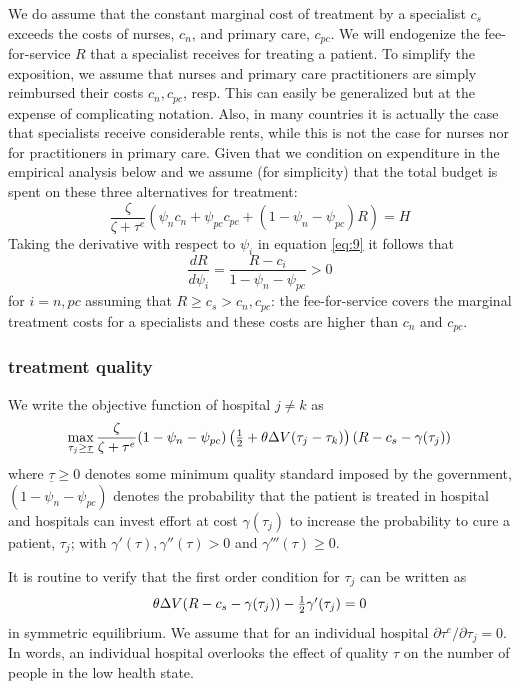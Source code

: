 \documentclass[12pt,english,a4paper]{article}
\begin{document}
We do assume that the constant marginal cost of treatment by a specialist \(c_s\) exceeds the costs of nurses, \(c_n\), and primary care, \(c_{pc}\). We will endogenize the fee-for-service \(R\) that a specialist receives for treating a patient. To simplify the exposition, we assume that nurses and primary care practitioners are simply reimbursed their costs \(c_n, c_{pc}\), resp. This can easily be generalized but at the expense of complicating notation. Also, in many countries it is actually the case that specialists receive considerable rents, while this is not the case for nurses nor for practitioners in primary care. Given that we condition on expenditure in the empirical analysis below and we assume (for simplicity) that the total budget is spent on these three alternatives for treatment:
\begin{equation}
\label{eq:9}
\frac{\zeta}{\zeta + \tau^e}(\psi_n c_n + \psi_{pc} c_{pc} + (1-\psi_n-\psi_{pc}) R) = H
\end{equation}
Taking the derivative with respect to \(\psi_i\) in equation \eqref{eq:9} it follows that
\begin{equation}
\label{eq:11}
\frac{dR}{d\psi_i} = \frac{R-c_i}{1-\psi_n - \psi_{pc}} > 0
\end{equation}
for \(i=n,pc\) assuming that \(R \geq c_s>c_n,c_{pc}\): the fee-for-service covers the marginal treatment costs for a specialists and these costs are higher than \(c_n\) and \(c_{pc}\).

\subsubsection{treatment quality}
\label{sec:org930fd7d}

We write the objective function of hospital \(j \neq k\) as
\begin{equation}
\label{eq:12}
\max_{\tau_j \geq \underline \tau} \frac{\zeta}{\zeta + \tau^e}(1-\psi_n-\psi_{pc})\left( \textstyle{1\over 2}  + \theta \Delta V (\tau_j - \tau_k) \right)(R-c_s - \gamma (\tau_j))
\end{equation}
where \(\underline \tau \geq 0\) denotes some minimum quality standard imposed by the government, \((1-\psi_n - \psi_{pc})\) denotes the probability that the patient is treated in hospital and hospitals can invest effort at cost \(\gamma( \tau_j)\) to increase the probability to cure a patient, \(\tau_j\); with \(\gamma'(\tau),\gamma''(\tau)>0\) and \(\gamma'''(\tau) \geq 0\).

It is routine to verify that the first order condition for \(\tau_j\) can be written as
\begin{equation}
\label{eq:13}
\theta \Delta V (R-c_s-\gamma(\tau_j))- \textstyle{1\over 2} \gamma'(\tau_{j})=0
\end{equation}
in symmetric equilibrium. We assume that for an individual hospital \(\partial \tau^e/ \partial \tau_j =0\). In words, an individual hospital overlooks the effect of quality \(\tau\) on the number of people in the low health state.
\end{document}
